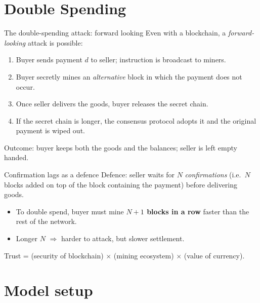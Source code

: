 \documentclass[aspectratio=169,xcolor=dvipsnames]{beamer}
\begin{document}
\section{Double Spending}

\begin{frame}{The double-spending attack: forward looking}
    Even with a blockchain, a \emph{forward-looking} attack is possible:
    \vspace{2mm}
    \begin{enumerate}
        \item Buyer sends payment $d$ to seller; instruction is broadcast to miners.
        \item Buyer secretly mines an \emph{alternative} block in which the payment does not occur.
        \item Once seller delivers the goods, buyer releases the secret chain.
        \item If the secret chain is longer, the consensus protocol adopts it and the
              original payment is wiped out.
    \end{enumerate}
    \vspace{2mm}
    Outcome: buyer keeps both the goods and the balances; seller is left empty handed.
\end{frame}

\begin{frame}{Confirmation lags as a defence}
    Defence: seller waits for $N$ \emph{confirmations} (i.e.\ $N$ blocks added on top of the
    block containing the payment) before delivering goods.
    \vspace{3mm}
    \begin{itemize}
        \item To double spend, buyer must mine \textbf{$N+1$ blocks in a row} faster than the
              rest of the network.
        \item Longer $N$ $\Rightarrow$ harder to attack, but slower settlement.
    \end{itemize}
    \vspace{3mm}
    Trust = (security of blockchain) $\times$ (mining ecosystem) $\times$ (value of currency).
\end{frame}

\section{Model setup}
\end{document}
